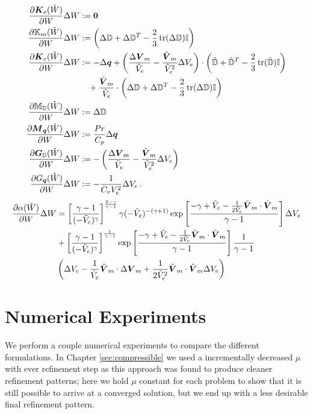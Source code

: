 \documentclass[Dissertation.tex]{subfiles}
\begin{document}
\begin{align*}
\frac{\partial\boldsymbol K_c(\tilde W)}{\partial W}\Delta W&:=
	\boldsymbol 0\\
\frac{\partial\mathbb{K}_m(\tilde W)}{\partial W}\Delta W&:=
	\left( \Delta\mathbb{D}+\Delta\mathbb{D}^T-\frac{2}{3}\operatorname*{tr}(\Delta\mathbb{D})\mathbb{I} \right)
	\\
\frac{\partial\boldsymbol K_e(\tilde W)}{\partial W}\Delta W&:=
	-\Delta\boldsymbol q+
	\left( \frac{\Delta\boldsymbol V_m}{\tilde V_e}-\frac{\tilde{\boldsymbol V}_m}{\tilde V_e^2}\Delta V_e \right)
	\cdot\left( \tilde{\mathbb{D}}+\tilde{\mathbb{D}}^T-\frac{2}{3}\operatorname*{tr}(\tilde{\mathbb{D}})\mathbb{I} \right)
	\\&\quad
	+\frac{\tilde{\boldsymbol V}_m}{\tilde V_e}\cdot\left( \Delta\mathbb{D}+\Delta\mathbb{D}^T-\frac{2}{3}\operatorname*{tr}(\Delta\mathbb{D})\mathbb{I} \right)\\
\frac{\partial\mathbb{M}_{\mathbb{D}}(\tilde W)}{\partial W}\Delta W&:=
	\Delta\mathbb{D}
	\\
\frac{\partial\boldsymbol M_{\boldsymbol q}(\tilde W)}{\partial W}\Delta W&:=
	\frac{Pr}{C_p}\Delta\boldsymbol q
	\\
\frac{\partial\boldsymbol G_{\mathbb{D}}(\tilde W)}{\partial W}\Delta W&:=
	-\left( \frac{\Delta\boldsymbol V_m}{\tilde V_e}-\frac{\tilde{\boldsymbol V}_m}{\tilde V_e^2}\Delta V_e \right)
	\\
\frac{\partial G_{\boldsymbol q}(\tilde W)}{\partial W}\Delta W&:=
	-\frac{1}{C_vV_e^2}\Delta V_e
	\,.
\end{align*}
\begin{align*}
\frac{\partial\alpha(\tilde W)}{\partial W}\Delta W&=
\left[ \frac{\gamma-1}{(-\tilde V_e)^\gamma} \right]^{\frac{2-\gamma}{\gamma-1}}
\gamma(-\tilde V_e)^{-(\gamma+1)}
\exp\left[ \frac{-\gamma+\tilde V_c-\frac{1}{2\tilde V_e}\tilde{\boldsymbol V}_m\cdot\tilde{\boldsymbol V}_m}{\gamma-1} \right]
\Delta V_e\\
&+\left[ \frac{\gamma-1}{(-\tilde V_e)^\gamma} \right]^{\frac{1}{\gamma-1}}
\exp\left[ \frac{-\gamma+\tilde V_c-\frac{1}{2\tilde V_e}\tilde{\boldsymbol V}_m\cdot\tilde{\boldsymbol V}_m}{\gamma-1} \right]
\frac{1}{\gamma-1}\\
&\left( \Delta V_c
-\frac{1}{\tilde V_e}\tilde{\boldsymbol V}_m\cdot\Delta\boldsymbol V_m
+\frac{1}{2\tilde V_e^2}\tilde{\boldsymbol V}_m\cdot\tilde{\boldsymbol V}_m\Delta V_e
 \right)
\end{align*}


\section{Numerical Experiments}
We perform a couple numerical experiments to compare the different formulations.
In Chapter \ref{sec:compressible} we used a incrementally decreased $\mu$ with ever refinement step 
as this approach was found to produce cleaner refinement patterns; here we hold $\mu$ constant
for each problem to show that it is still possible to arrive at a converged solution, but
we end up with a less desirable final refinement pattern.
\end{document}
